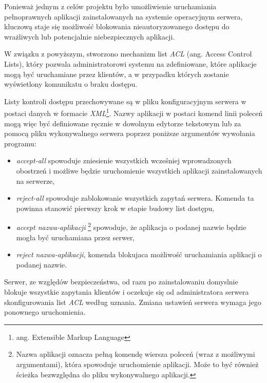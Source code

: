 Ponieważ jednym z celów projektu było umożliwienie uruchamiania pełnoprawnych aplikacji zainstalowanych na systemie operacyjnym serwera, kluczową staje się możliwość blokowania nieautoryzowanego dostępu do wrażliwych lub potencjalnie niebezpiecznych aplikacji.

W związku z powyższym, stworzono mechanizm list \emph{ACL} (ang. Access Control Lists), który pozwala administratorowi systemu na zdefiniowane, które aplikacje mogą być uruchamiane przez klientów, a w przypadku których zostanie wyświetlony komunikatu o braku dostępu.

Listy kontroli dostępu przechowywane są w pliku konfiguracyjnym serwera w postaci danych w formacie \emph{XML}\footnote{ang. Extensible Markup Language}. Nazwy aplikacji w postaci komend linii poleceń mogą więc być definiowane ręcznie w dowolnym edytorze tekstowym lub za pomocą pliku wykonywalnego serwera poprzez poniższe argumentów wywołania programu:

\begin{itemize}
\item \emph{accept-all}
spowoduje zniesienie wszystkich wcześniej wprowadzonych obostrzeń i możliwe będzie uruchomienie wszystkich aplikacji zainstalowanych na serwerze,
\item \emph{reject-all}
spowoduje zablokowanie wszystkich zapytań serwera. Komenda ta powinna stanowić pierwszy krok w etapie budowy list dostępu,
\item \emph{accept nazwa-aplikacji} \footnote{Nazwa aplikacji oznacza pełną komendę wiersza poleceń (wraz z możliwymi argumentami), która spowoduje uruchomienie aplikacji. Może to być również ścieżka bezwzględna do pliku wykonywalnego aplikacji.}
spowoduje, że aplikacja o podanej nazwie będzie mogła być uruchamiana przez serwer,
\item \emph{reject nazwa-aplikacji},
komenda blokujaca możliwość uruchamiania aplikacji o podanej nazwie.
\end{itemize}

Serwer, ze względów bezpieczeństwa, od razu po zainstalowaniu domyslnie blokuje wszystkie zapytania klientów i oczekuje się od administratora serwera skonfigurowania list \emph{ACL} według uznania. Zmiana ustawień serwera wymaga jego ponownego uruchomienia.